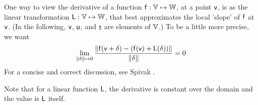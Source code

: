 \label{sec:Derivatives}

One way to view the derivative of a function
$\mathsf{f}:\mathbb{V} \mapsto \mathbb{W}$,
at a point $\mathsf{v}$,
is as the linear transformation $\mathsf{L}:\mathbb{V} \mapsto \mathbb{W}$,
that best approximates the local 'slope' of $\mathsf{f}$ at $\mathsf{v}$.
(In the following, $\mathsf{v}$, $\mathsf{u}$, and $\mathsf{t}$ are elements of $\mathbb{V}$.)
To be a little more precise, we want
\begin{equation}
\lim_{ \|{\bf \delta}  \| \mapsto 0}
\frac{ \| \mathsf{f}(\mathsf{v} + {\bf \delta}) - (\mathsf{f}(\mathsf{v}) + \mathsf{L}({\bf\delta})) \|}
{\|{\bf \delta}  \| }
 = 0
\end{equation}
For a concise and correct discussion, see Spivak \cite{spivak-1965}.

Note that for a linear function $\mathsf{L}$,
the derivative is constant over the domain
and the value is $\mathsf{L}$ itself.

